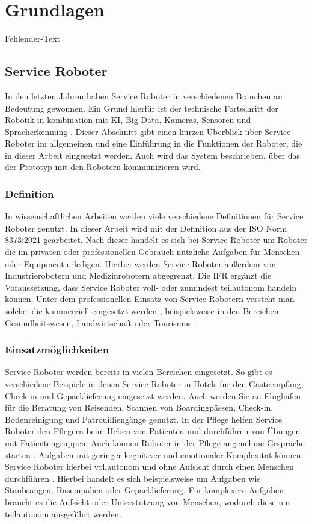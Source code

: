 \newpage
\section{Grundlagen}\label{Grundlagen}
Fehlender-Text

\subsection{Service Roboter}
In den letzten Jahren haben Service Roboter in verschiedenen Branchen an Bedeutung gewonnen. Ein Grund hierfür ist der technische Fortschritt der Robotik in kombination mit KI, Big Data, Kameras, Sensoren und Spracherkennung \cite[S.~424]{Paluch2020}. Dieser Abschnitt gibt einen kurzen Überblick über Service Roboter im allgemeinen und eine Einführung in die Funktionen der Roboter, die in dieser Arbeit eingesetzt werden. Auch wird das System beschrieben, über das der Prototyp mit den Robotern kommunizieren wird.

\subsubsection{Definition}
In wissenschaftlichen Arbeiten werden viele verschiedene Definitionen für Service Roboter genutzt. In dieser Arbeit wird mit der Definition aus der ISO Norm 8373:2021 \cite[Kap.~3]{ISO2021} gearbeitet. Nach dieser handelt es sich bei Service Roboter um Roboter die im privaten oder professionellen Gebrauch nützliche Aufgaben für Menschen oder Equipment erledigen. Hierbei werden Service Roboter außerdem von Industrierobotern und Medizinrobotern abgegrenzt. Die \ac{IFR} \cite{IFR2024} ergänzt die Voraussetzung, dass Service Roboter voll- oder zumindest teilautonom handeln können. Unter dem professionellen Einsatz von Service Robotern versteht man solche, die kommerziell eingesetzt werden \cite[S.~4]{GonzalezAguirre2021}, beispielsweise in den Bereichen Gesundheitswesen, Landwirtschaft oder Tourismus \cite[S.~9]{GonzalezAguirre2021}.

\subsubsection{Einsatzmöglichkeiten}
Service Roboter werden bereits in vielen Bereichen eingesetzt. So gibt es verschiedene Beispiele in denen Service Roboter in Hotels für den Gästeempfang, Check-in und Gepäcklieferung eingesetzt werden. Auch werden Sie an Flughäfen für die Beratung von Reisenden, Scannen von Boardingpässen, Check-in, Bodenreinigung und Patrouilliengänge genutzt. In der Pflege helfen Service Roboter den Pflegern beim Heben von Patienten und durchführen von Übungen mit Patientengruppen. Auch können Roboter in der Pflege angenehme Gespräche starten \cite[S.~425-427]{Paluch2020}. Aufgaben mit geringer kognitiver und emotionaler Komplexität können Service Roboter hierbei vollautonom und ohne Aufsicht durch einen Menschen durchführen \cite[S.~429]{Paluch2020}. Hierbei handelt es sich beispielsweise um Aufgaben wie Staubsaugen, Rasenmähen oder Gepäcklieferung. Für komplexere Aufgaben braucht es die Aufsicht oder Unterstützung von Menschen, wodurch diese nur teilautonom ausgeführt werden.

